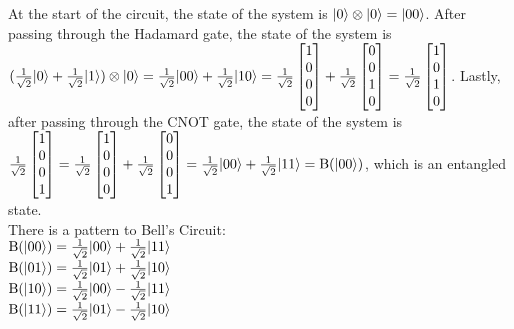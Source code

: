 At the start of the circuit, the state of the system is $\lvert0\rangle \otimes \lvert0\rangle = \lvert00\rangle$. After passing through the Hadamard gate, the state of the system is $(\frac{1}{\sqrt{2}} \lvert0\rangle + \frac{1}{\sqrt{2}} \lvert1\rangle) \otimes \lvert0\rangle = \frac{1}{\sqrt{2}}\lvert00\rangle + \frac{1}{\sqrt{2}} \lvert10\rangle = \frac{1}{\sqrt{2}} \begin{bmatrix}
    1\\
    0\\
    0\\
    0\\
\end{bmatrix} + \frac{1}{\sqrt{2}} \begin{bmatrix}
    0\\
    0\\
    1\\
    0
\end{bmatrix} = \frac{1}{\sqrt{2}} \begin{bmatrix}
    1\\
    0\\
    1\\
    0
\end{bmatrix}$. Lastly, after passing through the CNOT gate, the state of the system is $\frac{1}{\sqrt{2}} \begin{bmatrix}
    1\\
    0\\
    0\\
    1
\end{bmatrix} = \frac{1}{\sqrt{2}}\begin{bmatrix}
    1\\
    0\\
    0\\
    0\\
\end{bmatrix} + \frac{1}{\sqrt{2}} \begin{bmatrix}
    0\\
    0\\
    0\\
    1
\end{bmatrix} = \frac{1}{\sqrt{2}} \lvert00\rangle + \frac{1}{\sqrt{2}} \lvert11\rangle = \mathrm{B}(\lvert00\rangle)$, which is an entangled state.\\

There is a pattern to Bell's Circuit:\\
$\mathrm{B}(\lvert00\rangle) = \frac{1}{\sqrt{2}} \lvert00\rangle + \frac{1}{\sqrt{2}} \lvert11\rangle$\\
$\mathrm{B}(\lvert01\rangle) = \frac{1}{\sqrt{2}} \lvert01\rangle + \frac{1}{\sqrt{2}} \lvert10\rangle$\\
$\mathrm{B}(\lvert10\rangle) = \frac{1}{\sqrt{2}} \lvert00\rangle - \frac{1}{\sqrt{2}} \lvert11\rangle$\\
$\mathrm{B}(\lvert11\rangle) = \frac{1}{\sqrt{2}} \lvert01\rangle - \frac{1}{\sqrt{2}} \lvert10\rangle$\\

